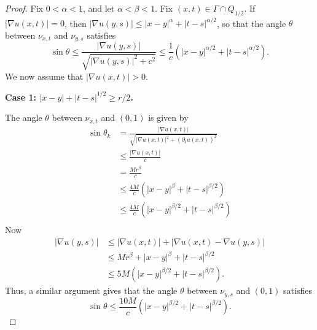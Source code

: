 \documentclass[10pt,a4paper]{amsart}
\begin{document}
\begin{proof}
    Fix $0<\alpha<1$, and let $\alpha<\beta<1$. Fix $(x,t) \in \Gamma \cap Q_{1/2}$. If $|\nabla u(x,t)|=0$, then 
    $|\nabla u(y,s)|\leq |x-y|^{\alpha}+|t-s|^{\alpha/2}$, so that the angle $\theta$ between $\nu_{x,t}$ and $\nu_{y,s}$ satisfies
    \[
    \sin \theta \leq \frac{|\nabla u(y,s)|}{\sqrt{|\nabla u(y,s)|^2 + c^2}}
    \leq \frac{1}{c} (|x-y|^{\alpha/2}+|t-s|^{\alpha/2}). 
    \]
    We now assume that $|\nabla u(x,t)|>0$. 
    
   \noindent  \textbf{Case 1: $|x-y|+|t-s|^{1/2}\geq r/2$.}

     The angle $\theta$ between $\nu_{x,t}$ and $(0,1)$ is given by 
    \[
     \begin{aligned}
     \sin \theta_k&=\frac{|\nabla u(x,t)|}{\sqrt{|\nabla u(x,t)|^2 + (\partial_t u(x,t))^2}} \\
    &\leq \frac{|\nabla u(x,t)|}{c} \\
    &= \frac{Mr^{\beta}}{c}\\
    &\leq \frac{4M}{c}\left(|x - y|^{\beta}+|t-s|^{\beta/2} \right)\\
    &\leq \frac{4M}{c}\left(|x - y|^{\beta/2}+|t-s|^{\beta/2} \right) \\
    \end{aligned}
    \]
    Now
    \[
    \begin{aligned}
    |\nabla u(y,s)|&\leq |\nabla u(x,t)|+|\nabla u(x,t)-\nabla u(y,s)| \\
    &\leq Mr^{\beta} + |x-y|^{\beta}+ |t-s|^{\beta/2}\\
    &\leq 5M(|x-y|^{\beta/2}+ |t-s|^{\beta/2}).
    \end{aligned}
    \]
    Thus, a similar argument gives that the angle $\theta$ between $\nu_{y,s}$ and $(0,1)$ satisfies
    \[
    \sin \theta \leq \frac{10M}{c}\left(|x - y|^{\beta/2}+|t-s|^{\beta/2} \right).
    \]



\end{proof}
\end{document}
